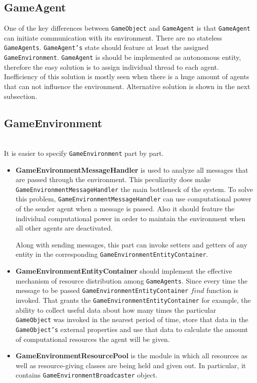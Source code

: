 \subsection{GameAgent}
One of the key differences between \texttt{GameObject} and \texttt{GameAgent} is that \texttt{GameAgent} can initiate communication with its environment. There are no stateless \texttt{GameAgents}. \texttt{GameAgent's} state should feature at least the assigned \texttt{GameEnvironment}.
\texttt{GameAgent} is should be implemented as autonomous entity, therefore the easy solution is to assign individual thread to each agent. Inefficiency of this solution is mostly seen when there is a huge amount of agents that can not influence the environment. Alternative solution is shown in the next subsection.

\subsection{GameEnvironment} \\
It is easier to specify \texttt{GameEnvironment} part by part.
\begin{itemize}
\item \textbf{GameEnvironmentMessageHandler} is used to analyze all messages that are passed through the environment. This peculiarity does make \break \texttt{GameEnvironmentMessageHandler} the main bottleneck of the system. To solve this problem, \texttt{GameEnvironmentMessageHandler} can use computational power of the sender agent when a message is passed. Also it should feature the individual computational power in order to maintain the environment when all other agents are deactivated.\par
    Along with sending messages, this part can invoke setters and getters of any entity in the corresponding \texttt{GameEnvironmentEntityContainer}.
\item \textbf{GameEnvironmentEntityContainer} should implement the effective mechanism of resource distribution among \texttt{GameAgents}. Since every time the message to be passed  \texttt{GameEnvironmentEntityContainer} $find$ function is invoked. That grants the \texttt{GameEnvironmentEntityContainer} for example, the ability to collect useful data about how many times the particular \texttt{GameObject} was invoked in the nearest period of time, store that data in the \texttt{GameObject's} external properties and use that data to calculate the amount of computational resources the agent will be given.

\item \textbf{GameEnvironmentResourcePool} is the module in which all resources as well as resource-giving classes are being held and given out. In particular, it contains \texttt{GameEnvironmentBroadcaster} object.
\end{itemize}

